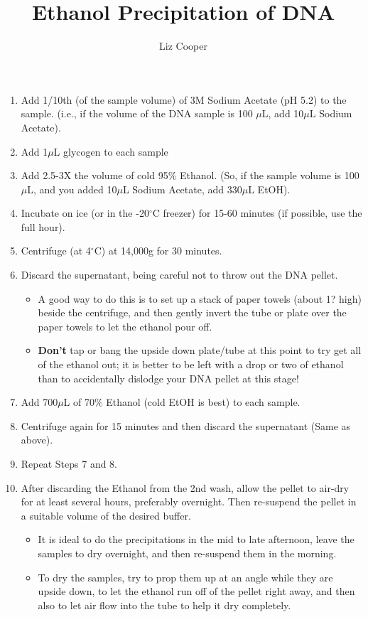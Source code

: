 \documentclass{article}
\begin{document}
\title{Ethanol Precipitation of DNA}
\author{Liz Cooper}
\maketitle

\begin{enumerate}

\item Add 1/10th (of the sample volume) of 3M Sodium Acetate (pH 5.2) to the sample.  (i.e., if the volume of the DNA sample is 100 $\mu$L, add 10$\mu$L Sodium Acetate).

\item Add 1$\mu$L glycogen to each sample

\item Add 2.5-3X the volume of cold 95\% Ethanol.  (So, if the sample volume is 100$\mu$L, and you added 10$\mu$L Sodium Acetate, add 330$\mu$L EtOH).

\item Incubate on ice (or in the -20$^{\circ}$C freezer) for 15-60 minutes (if possible, use the full hour).

\item Centrifuge (at 4$^{\circ}$C) at 14,000g for 30 minutes.

\item Discard the supernatant, being careful not to throw out the DNA pellet.
	\begin{itemize}
		\item A good way to do this is to set up a stack of paper towels (about 1? high) beside the centrifuge, and then gently invert the tube or plate over the paper towels to let the ethanol pour off.  
		\item \textbf{Don't} tap or bang the upside down plate/tube at this point to try get all of the ethanol out; it is better to be left with a drop or two of ethanol than to accidentally dislodge your DNA pellet at this stage!
	\end{itemize}  

\item Add 700$\mu$L of 70\% Ethanol (cold EtOH is best) to each sample.

\item Centrifuge again for 15 minutes and then discard the supernatant (Same as above).

\item Repeat Steps 7 and 8.

\item After discarding the Ethanol from the 2nd wash, allow the pellet to air-dry for at least several hours, preferably overnight.  Then re-suspend the pellet in a suitable volume of the desired buffer.
	\begin{itemize}
		\item  It is ideal to do the precipitations in the mid to late afternoon, leave the samples to dry overnight, and then re-suspend them in the morning.
		\item To dry the samples, try to prop them up at an angle while they are upside down, to let the ethanol run off of the pellet right away, and then also to let air flow into the tube to help it dry completely.
	\end{itemize}
		
\end{enumerate}
		
		
\end{document}
